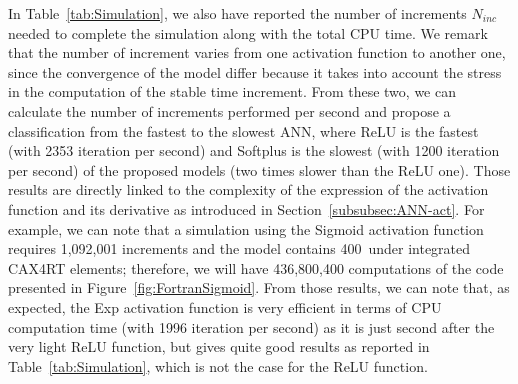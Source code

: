 \documentclass[algorithms,article,accept,pdftex,oneauthor]{Definitions/mdpi}
\begin{document}
In Table~\ref{tab:Simulation}, we also have reported the number of increments $N_{inc}$ needed to complete the simulation along with the total CPU time.
We remark that the number of increment varies from one activation function to another one, since the convergence of the model differ because it takes into account the stress in the computation of the stable time increment.
From these two, we can calculate the number of increments performed per second and propose a classification from the fastest to the slowest ANN, where ReLU is the fastest (with 2353 iteration per second) and Softplus is the slowest (with 1200 iteration per second) of the proposed models (two times slower than the ReLU one).
Those results are directly linked to the complexity of the expression of the activation function and its derivative as introduced in Section~\ref{subsubsec:ANN-act}.
For example, we can note that a simulation using the Sigmoid activation function requires 1,092,001 increments and the model contains 400~under integrated CAX4RT elements; therefore, we will have 436,800,400 computations of the code presented in Figure~\ref{fig:FortranSigmoid}.
From those results, we can note that, as expected, the Exp activation function is very efficient in terms of CPU computation time (with 1996 iteration per second) as it is just second after the very light ReLU function, but gives quite good results as reported in Table~\ref{tab:Simulation}, which is not the case for the ReLU function.
\end{document}
